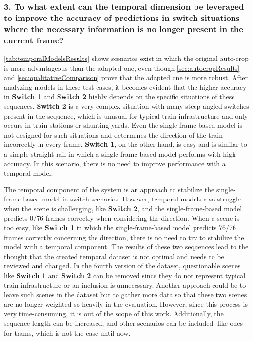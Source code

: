 \subsubsection{3. To what extent can the temporal dimension be leveraged to improve the accuracy of predictions in switch situations where the necessary information is no longer present in the current frame?}

\autoref{tab:temporalModelsResults} shows scenarios exist in which the original auto-crop is more advantageous than the adapted one, even though \autoref{sec:autocropResults} and \autoref{sec:qualitativeComparison} prove that the adapted one is more robust.
After analyzing models in these test cases, it becomes evident that the higher accuracy in \textbf{Switch 1} and \textbf{Switch 2} highly depends on the specific situations of these sequences.
\textbf{Switch 2} is a very complex situation with many steep angled switches present in the sequence, which is unusual for typical train infrastructure and only occurs in train stations or shunting yards.
Even the single-frame-based model is not designed for such situations and determines the direction of the train incorrectly in every frame.
\textbf{Switch 1}, on the other hand, is easy and is similar to a simple straight rail in which a single-frame-based model performs with high accuracy.
In this scenario, there is no need to improve performance with a temporal model.

The temporal component of the system is an approach to stabilize the single-frame-based model in switch scenarios.
However, temporal models also struggle when the scene is challenging, like \textbf{Switch 2}, and the single-frame-based model predicts 0/76 frames correctly when considering the direction.
When a scene is too easy, like \textbf{Switch 1} in which the single-frame-based model predicts 76/76 frames correctly concerning the direction, there is no need to try to stabilize the model with a temporal component.
The results of these two sequences lead to the thought that the created temporal dataset is not optimal and needs to be reviewed and changed.
In the fourth version of the dataset, questionable scenes like \textbf{Switch 1} and \textbf{Switch 2} can be removed since they do not represent typical train infrastructure or an inclusion is unnecessary.
Another approach could be to leave such scenes in the dataset but to gather more data so that these two scenes are no longer weighted so heavily in the evaluation.
However, since this process is very time-consuming, it is out of the scope of this work.
Additionally, the sequence length can be increased, and other scenarios can be included, like ones for trams, which is not the case until now.

